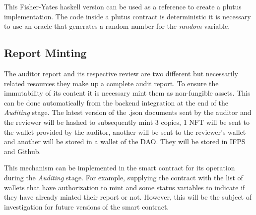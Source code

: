 \documentclass[9pt]{article}
\begin{document}
This Fisher-Yates haskell version can be used as a reference to create a plutus implementation. The code inside a plutus contract is deterministic it is necessary to use an oracle that generates a random number for the \emph { random } variable.

\subsection { Report Minting }

The auditor report and its respective review are two different but necessarily related resources they make up a complete audit report. To ensure the immutability of its content it is necessary mint them as non-fungible assets. This can be done automatically from the backend integration at the end of the \emph{Auditing} stage. 
The latest version of the .json documents sent by the auditor and the reviewer will be hashed to subsequently mint 3 copies, 1 NFT will be sent to the wallet provided by the auditor, another will be sent to the reviewer's wallet and another will be stored in a wallet of the DAO. They will be stored in IFPS and Github.

This mechanism can be implemented in the smart contract for its operation during the \emph{Auditing} stage. For example, supplying the contract with the list of wallets that have authorization to mint and some status variables to indicate if they have already minted their report or not. However, this will be the subject of investigation for future versions of the smart contract.
\end{document}
